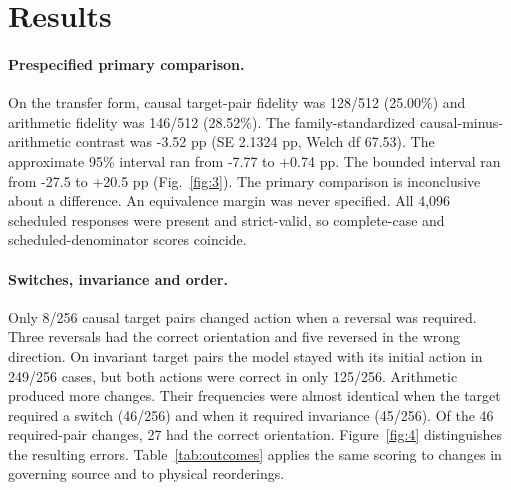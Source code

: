 \section{Results}
\paragraph{Prespecified primary comparison.}
On the transfer form, causal target-pair fidelity was 128/512 (25.00\%) and arithmetic fidelity was 146/512 (28.52\%). The family-standardized causal-minus-arithmetic contrast was -3.52 pp (SE 2.1324 pp, Welch df 67.53). The approximate 95\% interval ran from -7.77 to +0.74 pp. The bounded interval ran from -27.5 to +20.5 pp (Fig.~\ref{fig:3}). The primary comparison is inconclusive about a difference. An equivalence margin was never specified. All 4,096 scheduled responses were present and strict-valid, so complete-case and scheduled-denominator scores coincide.

\paragraph{Switches, invariance and order.}
Only 8/256 causal target pairs changed action when a reversal was required. Three reversals had the correct orientation and five reversed in the wrong direction. On invariant target pairs the model stayed with its initial action in 249/256 cases, but both actions were correct in only 125/256. Arithmetic produced more changes. Their frequencies were almost identical when the target required a switch (46/256) and when it required invariance (45/256). Of the 46 required-pair changes, 27 had the correct orientation. Figure~\ref{fig:4} distinguishes the resulting errors. Table~\ref{tab:outcomes} applies the same scoring to changes in governing source and to physical reorderings.

